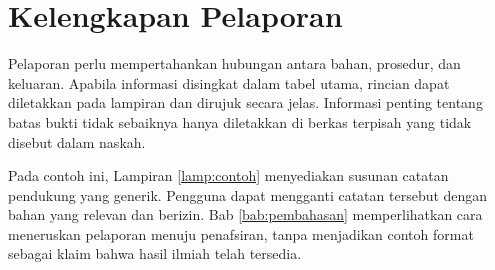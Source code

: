 \section{Kelengkapan Pelaporan}

Pelaporan perlu mempertahankan hubungan antara bahan, prosedur, dan keluaran. Apabila informasi disingkat dalam tabel utama, rincian dapat diletakkan pada lampiran dan dirujuk secara jelas. Informasi penting tentang batas bukti tidak sebaiknya hanya diletakkan di berkas terpisah yang tidak disebut dalam naskah.

Pada contoh ini, Lampiran \ref{lamp:contoh} menyediakan susunan catatan pendukung yang generik. Pengguna dapat mengganti catatan tersebut dengan bahan yang relevan dan berizin. Bab \ref{bab:pembahasan} memperlihatkan cara meneruskan pelaporan menuju penafsiran, tanpa menjadikan contoh format sebagai klaim bahwa hasil ilmiah telah tersedia.
